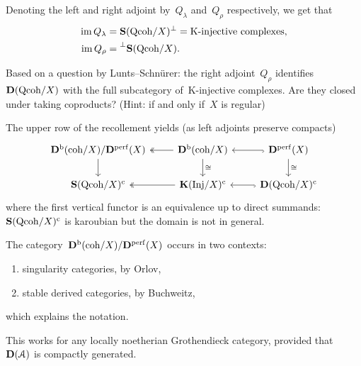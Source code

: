 \documentclass[10pt,a4paper]{article}
\begin{document}
\begin{remark}
  Denoting the left and right adjoint by~$Q_\lambda$ and~$Q_\rho$ respectively, we get that
  \begin{equation}
    \begin{aligned}
      \operatorname{im} Q_\lambda&=\operatorname{\mathbf{S}}(\mathrm{Qcoh}/X)^\perp=\text{K-injective complexes}, \\
      \operatorname{im} Q_\rho&=\prescript{\perp}{}{\operatorname{\mathbf{S}}(\ensuremath{\mathrm{Qcoh}}/X)}.
    \end{aligned}
  \end{equation}
\end{remark}

\begin{exercise}
  Based on a question by Lunts--Schn\"urer: the right adjoint~$Q_\rho$ identifies~$\mathbf{D}(\mathrm{Qcoh}/X)$ with the full subcategory of~K-injective complexes. Are they closed under taking coproducts? (Hint: if and only if~$X$ is regular)
\end{exercise}

\begin{corollary}
  The upper row of the recollement yields (as left adjoints preserve compacts)
  \begin{equation}
    \begin{tikzcd}
      \derived^\bounded(\coh/X)/\derived^\perf(X) \arrow{d} & \derived^\bounded(\coh/X) \arrow{d}{\cong} \arrow[two heads]{l} & \derived^\perf(X) \arrow{d}{\cong} \arrow[hook]{l} \\
      \SSing(\Qcoh/X)^\cc & \KKK(\Inj/X)^\cc \arrow[two heads]{l} & \derived(\Qcoh/X)^\cc \arrow[hook]{l}
    \end{tikzcd}
  \end{equation}
  where the first vertical functor is an equivalence up to direct summands: $\operatorname{\mathbf{S}}(\mathrm{Qcoh}/X)^{\mathrm{c}}$ is karoubian but the domain is not in general.
\end{corollary}
The category~$\mathbf{D}^{\mathrm{b}}(\mathrm{coh}/X)/\mathbf{D}^{\mathrm{perf}}(X)$ occurs in two contexts:
\begin{enumerate}
  \item singularity categories, by Orlov,
  \item stable derived categories, by Buchweitz,
\end{enumerate}
which explains the notation.

\begin{remark}
  This works for any locally noetherian Grothendieck category, provided that~$\mathbf{D}(\mathcal{A})$ is compactly generated.
\end{remark}
\end{document}
